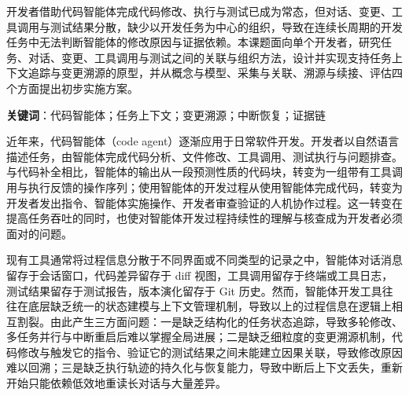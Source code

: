 %
%

\makeatletter
\renewcommand{\theHtable}{\thetable}
\renewcommand{\theHfigure}{\thefigure}
\makeatother

\iftjproposalabstract
{}

开发者借助代码智能体完成代码修改、执行与测试已成为常态，但对话、变更、工具调用与测试结果分散，缺少以开发任务为中心的组织，导致在连续长周期的开发任务中无法判断智能体的修改原因与证据依赖。本课题面向单个开发者，研究任务、对话、变更、工具调用与测试之间的关联与组织方法，设计并实现支持任务上下文追踪与变更溯源的原型，并从概念与模型、采集与关联、溯源与续接、评估四个方面提出初步实施方案。

\textbf{关键词}：代码智能体；任务上下文；变更溯源；中断恢复；证据链
\fi



近年来，代码智能体（code agent）逐渐应用于日常软件开发。开发者以自然语言描述任务，由智能体完成代码分析、文件修改、工具调用、测试执行与问题排查。与代码补全相比，智能体的输出从一段预测性质的代码块，转变为一组带有工具调用与执行反馈的操作序列；使用智能体的开发过程从使用智能体完成代码，转变为开发者发出指令、智能体实施操作、开发者审查验证的人机协作过程。这一转变在提高任务吞吐的同时，也使对智能体开发过程持续性的理解与核查成为开发者必须面对的问题。

现有工具通常将过程信息分散于不同界面或不同类型的记录之中，智能体对话消息留存于会话窗口，代码差异留存于 diff 视图，工具调用留存于终端或工具日志，测试结果留存于测试报告，版本演化留存于 Git 历史。然而，智能体开发工具往往在底层缺乏统一的状态建模与上下文管理机制，导致以上的过程信息在逻辑上相互割裂。由此产生三方面问题：一是缺乏结构化的任务状态追踪，导致多轮修改、多任务并行与中断重启后难以掌握全局进展；二是缺乏细粒度的变更溯源机制，代码修改与触发它的指令、验证它的测试结果之间未能建立因果关联，导致修改原因难以回溯；三是缺乏执行轨迹的持久化与恢复能力，导致中断后上下文丢失，重新开始只能依赖低效地重读长对话与大量差异。

